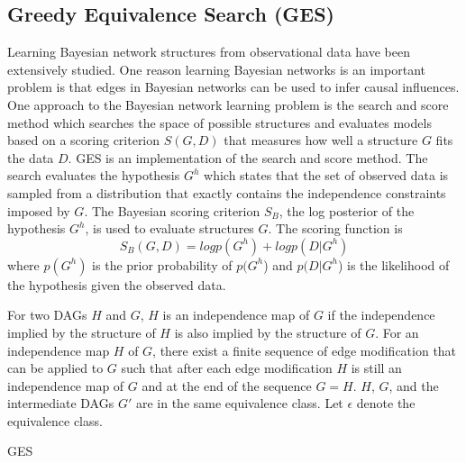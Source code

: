 \subsection{Greedy Equivalence Search (GES)} \label{GESSubsection}
Learning Bayesian network structures from observational data have been extensively studied. One reason learning Bayesian networks is an important problem is that edges in Bayesian networks can be used to infer causal influences. One approach to the Bayesian network learning problem is the search and score method which searches the space of possible structures and evaluates models based on a scoring criterion \(S(G,D)\) that measures how well a structure $G$ fits the data $D$. GES is an implementation of the search and score method. The search evaluates the hypothesis \(G^h\) which states that the set of observed data is sampled from a distribution that exactly contains the independence constraints imposed by \(G\). The Bayesian scoring criterion \(S_B\), the log posterior of the hypothesis \(G^h\), is used to evaluate structures $G$. The scoring function is 
\begin{equation}
S_B(G,D) = logp(G^h) + logp(D|G^h) 
\end{equation} where \(p(G^h)\) is the prior probability of \(p(G^h\)) and \(p(D|G^h\)) is the likelihood of the hypothesis given the observed data. 

For two DAGs \(H\) and \(G\), \(H\) is an independence map of \(G\) if the independence implied by the structure of \(H\) is also implied by the structure of \(G\). For an independence map \(H\) of \(G\), there exist a finite sequence of edge modification that can be applied to \(G\) such that after each edge modification \(H\) is still an independence map of \(G\) and at the end of the sequence \(G = H\). \(H\), \(G\), and the intermediate DAGs \(G'\) are in the same equivalence class. Let \(\epsilon\) denote the equivalence class.

\begin{algorithm}
\caption{GES} \label{GES}
\begin{algorithmic}[1]
\EndIf
\EndFor
\EndFor
\EndWhile

\EndIf
\EndFor
\EndFor
\EndWhile
{}

\EndProcedure
\end{algorithmic}
\end{algorithm}

